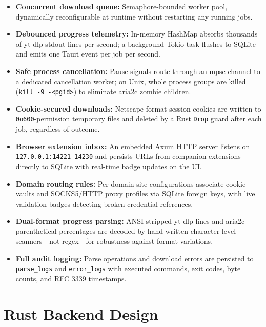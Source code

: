 \documentclass[10pt,letterpaper]{article}
\begin{document}
\begin{itemize}[leftmargin=1.6em, itemsep=3pt]
  \item \textbf{Concurrent download queue:} Semaphore-bounded worker pool, dynamically
        reconfigurable at runtime without restarting any running jobs.
  \item \textbf{Debounced progress telemetry:} In-memory HashMap absorbs thousands of
        yt-dlp stdout lines per second; a background Tokio task flushes to SQLite and
        emits one Tauri event per job per second.
  \item \textbf{Safe process cancellation:} Pause signals route through an mpsc channel
        to a dedicated cancellation worker; on Unix, whole process groups are killed
        (\texttt{kill -9 -<pgid>}) to eliminate aria2c zombie children.
  \item \textbf{Cookie-secured downloads:} Netscape-format session cookies are written
        to \texttt{0o600}-permission temporary files and deleted by a Rust \texttt{Drop}
        guard after each job, regardless of outcome.
  \item \textbf{Browser extension inbox:} An embedded Axum HTTP server listens on
        \texttt{127.0.0.1:14221--14230} and persists URLs from companion extensions
        directly to SQLite with real-time badge updates on the UI.
  \item \textbf{Domain routing rules:} Per-domain site configurations associate cookie
        vaults and SOCKS5/HTTP proxy profiles via SQLite foreign keys, with live
        validation badges detecting broken credential references.
  \item \textbf{Dual-format progress parsing:} ANSI-stripped yt-dlp lines and
        aria2c parenthetical percentages are decoded by hand-written character-level
        scanners---not regex---for robustness against format variations.
  \item \textbf{Full audit logging:} Parse operations and download errors are persisted
        to \texttt{parse\_logs} and \texttt{error\_logs} with executed commands, exit
        codes, byte counts, and RFC 3339 timestamps.
\end{itemize}

\section{Rust Backend Design}
\end{document}
